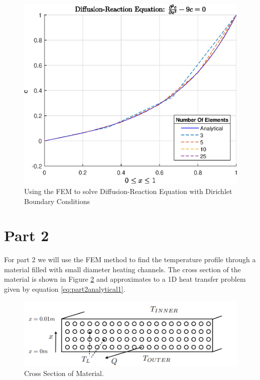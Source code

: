 \documentclass[11pt]{article}
\begin{document}
\begin{figure}[ht] 

    \centering
    \includegraphics{epsReactDiff1}
    \caption{Using the FEM to solve Diffusion-Reaction Equation with Dirichlet Boundary Conditions}\label{fig:ChangeMesh}
\end{figure}

\clearpage

\section{Part 2}

For part 2 we will use the FEM method to find the temperature profile through a material filled with small diameter heating channels. The cross section of the material is shown in Figure \ref{fig:CrossSection} and approximates to a 1D heat transfer problem given by equation \ref{eq:part2analytical1}.

\begin{figure}[h!] 
    \centering
    \includegraphics{CrossSection}
    \caption{Cross Section of Material.}\label{fig:CrossSection}
\end{figure}
\end{document}
